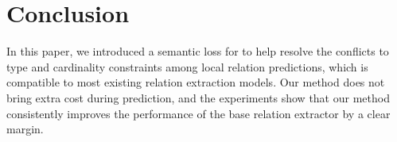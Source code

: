 \section{Conclusion}
In this paper, we introduced a semantic loss for \RE to help resolve the conflicts to type and cardinality constraints among local relation predictions, which is compatible to most existing relation extraction models.
Our method does not bring extra cost during prediction, and the experiments show that our method consistently improves the performance of the base relation extractor by a clear margin. 
